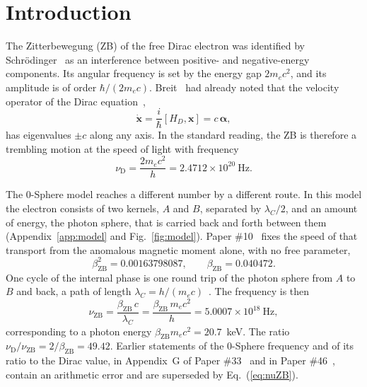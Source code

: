 \documentclass[%
 reprint, amsmath,amssymb, aps, prb, ]{revtex4-2}
\numberwithin{equation}{section}
\begin{document}
\section{Introduction}

The Zitterbewegung (ZB) of the free Dirac electron was identified by Schr\"odinger~\cite{Schrodinger1930} as an interference between positive- and negative-energy components. Its angular frequency is set by the energy gap $2m_ec^2$, and its amplitude is of order $\hbar/(2m_ec)$. Breit~\cite{Breit1928} had already noted that the velocity operator of the Dirac equation~\cite{Dirac1928},
\begin{equation}
\dot{\bm{x}} = \frac{i}{\hbar}[H_D,\bm{x}] = c\,\bm{\alpha},
\label{eq:velop}
\end{equation}
has eigenvalues $\pm c$ along any axis. In the standard reading, the ZB is therefore a trembling motion at the speed of light with frequency
\begin{equation}
\nu_{\text{D}} = \frac{2m_ec^2}{h} = 2.4712\times10^{20}\ \text{Hz}.
\label{eq:nuD}
\end{equation}

The 0-Sphere model reaches a different number by a different route. In this model the electron consists of two kernels, $A$ and $B$, separated by $\lambda_C/2$, and an amount of energy, the photon sphere, that is carried back and forth between them (Appendix~\ref{app:model} and Fig.~\ref{fig:model}). Paper \#10~\cite{H10} fixes the speed of that transport from the anomalous magnetic moment alone, with no free parameter,
\begin{equation}
\beta_{\text{ZB}}^2 = 0.00163798087, \qquad \beta_{\text{ZB}} = 0.040472.
\label{eq:beta}
\end{equation}
One cycle of the internal phase is one round trip of the photon sphere from $A$ to $B$ and back, a path of length $\lambda_C = h/(m_ec)$~\cite{H51}. The frequency is then
\begin{equation}
\nu_{\text{ZB}} = \frac{\beta_{\text{ZB}}\,c}{\lambda_C} = \frac{\beta_{\text{ZB}}\,m_ec^2}{h} = 5.0007\times10^{18}\ \text{Hz},
\label{eq:nuZB}
\end{equation}
corresponding to a photon energy $\beta_{\text{ZB}}m_ec^2 = 20.7$~keV. The ratio $\nu_{\text{D}}/\nu_{\text{ZB}} = 2/\beta_{\text{ZB}} = 49.42$. Earlier statements of the 0-Sphere frequency and of its ratio to the Dirac value, in Appendix~G of Paper \#33~\cite{H33} and in Paper \#46~\cite{H46}, contain an arithmetic error and are superseded by Eq.~(\ref{eq:nuZB}).
\end{document}
